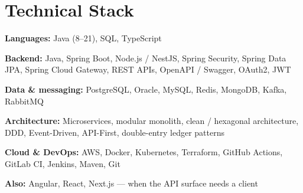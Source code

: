 \section{Technical Stack}

{\small
\textbf{Languages:} Java (8--21), SQL, TypeScript\par
\textbf{Backend:} Java, Spring Boot, Node.js / NestJS, Spring Security,
Spring Data JPA, Spring Cloud Gateway, REST APIs, OpenAPI / Swagger,
OAuth2, JWT\par
\textbf{Data \& messaging:} PostgreSQL, Oracle, MySQL, Redis, MongoDB,
Kafka, RabbitMQ\par
\textbf{Architecture:} Microservices, modular monolith, clean /
hexagonal architecture, DDD, Event-Driven, API-First, double-entry
ledger patterns\par
\textbf{Cloud \& DevOps:} AWS, Docker, Kubernetes, Terraform, GitHub
Actions, GitLab CI, Jenkins, Maven, Git\par
\textbf{Also:} Angular, React, Next.js --- when the API surface needs a
client\par
}
